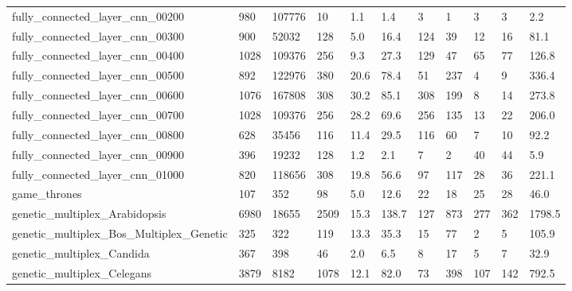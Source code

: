 \begin{longtable}{lllllllllll}
 fully\_connected\_layer\_cnn\_00200                    & 980        & 107776    & 10    & 1.1    & 1.4    & 3     & 1      & 3      & 3      & 2.2     \\
 fully\_connected\_layer\_cnn\_00300                    & 900        & 52032     & 128   & 5.0    & 16.4   & 124   & 39     & 12     & 16     & 81.1    \\
 fully\_connected\_layer\_cnn\_00400                    & 1028       & 109376    & 256   & 9.3    & 27.3   & 129   & 47     & 65     & 77     & 126.8   \\
 fully\_connected\_layer\_cnn\_00500                    & 892        & 122976    & 380   & 20.6   & 78.4   & 51    & 237    & 4      & 9      & 336.4   \\
 fully\_connected\_layer\_cnn\_00600                    & 1076       & 167808    & 308   & 30.2   & 85.1   & 308   & 199    & 8      & 14     & 273.8   \\
 fully\_connected\_layer\_cnn\_00700                    & 1028       & 109376    & 256   & 28.2   & 69.6   & 256   & 135    & 13     & 22     & 206.0   \\
 fully\_connected\_layer\_cnn\_00800                    & 628        & 35456     & 116   & 11.4   & 29.5   & 116   & 60     & 7      & 10     & 92.2    \\
 fully\_connected\_layer\_cnn\_00900                    & 396        & 19232     & 128   & 1.2    & 2.1    & 7     & 2      & 40     & 44     & 5.9     \\
 fully\_connected\_layer\_cnn\_01000                    & 820        & 118656    & 308   & 19.8   & 56.6   & 97    & 117    & 28     & 36     & 221.1   \\
 game\_thrones                                       & 107        & 352       & 98    & 5.0    & 12.6   & 22    & 18     & 25     & 28     & 46.0    \\
 genetic\_multiplex\_Arabidopsis                      & 6980       & 18655     & 2509  & 15.3   & 138.7  & 127   & 873    & 277    & 362    & 1798.5  \\
 genetic\_multiplex\_Bos\_Multiplex\_Genetic            & 325        & 322       & 119   & 13.3   & 35.3   & 15    & 77     & 2      & 5      & 105.9   \\
 genetic\_multiplex\_Candida                          & 367        & 398       & 46    & 2.0    & 6.5    & 8     & 17     & 5      & 7      & 32.9    \\
 genetic\_multiplex\_Celegans                         & 3879       & 8182      & 1078  & 12.1   & 82.0   & 73    & 398    & 107    & 142    & 792.5   \\

\end{longtable}
